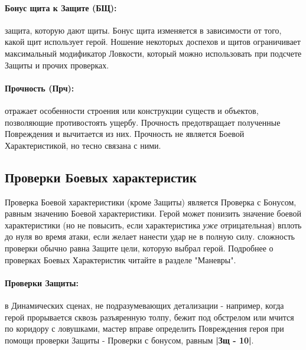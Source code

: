 \paragraph{Бонус щита к Защите (БЩ):} защита, которую дают щиты. Бонус щита изменяется в зависимости от того, какой щит использует герой.
\newline Ношение некоторых доспехов и щитов ограничивает максимальный модификатор Ловкости, который можно использовать при подсчете Защиты и прочих проверках.
\paragraph{Прочность (Прч):} отражает особенности строения или конструкции существ и объектов, позволяющие противостоять ущербу. Прочность предотвращает полученные Повреждения и вычитается из них.
\newline Прочность не является Боевой Характеристикой, но тесно связана с ними.

\subsection{Проверки Боевых характеристик}
Проверка Боевой характеристики (кроме Защиты) является Проверка с Бонусом, равным значению Боевой характеристики.
\newline Герой может понизить значение боевой характеристики (но не повысить, если характеристика \textit{уже} отрицательная) вплоть до нуля во время атаки, если желает нанести удар не в полную силу.
\newline сложность проверки обычно равна Защите цели, которую выбрал герой.
\newline Подробнее о проверках Боевых Характеристик читайте в разделе "Маневры".

\paragraph{Проверки Защиты:} в Динамических сценах, не подразумевающих детализации - например, когда герой прорывается сквозь разъяренную толпу, бежит под обстрелом или мчится по коридору с ловушками, мастер вправе определить Повреждения героя при помощи проверки Защиты - Проверки с бонусом, равным \textbf{|Зщ - 10|}.

